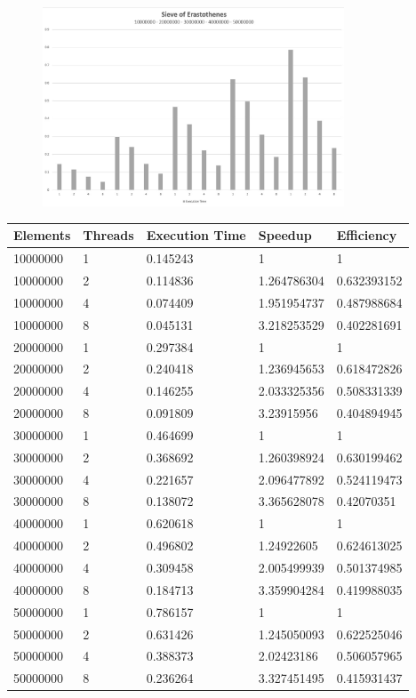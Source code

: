 \begin{figure}[H]
    \centering
    \includegraphics[width=0.8\textwidth]{graphics/Sieve.jpg}
    \label{fig:Sieve}
\end{figure}
\begin{table}[H]
    \centering
    \begin{tabular}{|l|l|l|l|l|}\hline
        Elements & Threads & Execution Time & Speedup & Efficiency \\\hline
        10000000 & 1 & 0.145243 & 1 & 1 \\
        10000000 & 2 & 0.114836 & 1.264786304 & 0.632393152\\
        10000000 & 4 & 0.074409 & 1.951954737 & 0.487988684\\
        10000000 & 8 & 0.045131 & 3.218253529 & 0.402281691\\\hline
        20000000 & 1 & 0.297384 & 1 & 1\\
        20000000 & 2 & 0.240418 & 1.236945653 & 0.618472826\\
        20000000 & 4 & 0.146255 & 2.033325356 & 0.508331339\\
        20000000 & 8 & 0.091809 & 3.23915956 & 0.404894945\\\hline
        30000000 & 1 & 0.464699 & 1 & 1\\
        30000000 & 2 & 0.368692 & 1.260398924 & 0.630199462\\
        30000000 & 4 & 0.221657 & 2.096477892 & 0.524119473\\
        30000000 & 8 & 0.138072 & 3.365628078 & 0.42070351\\\hline
        40000000 & 1 & 0.620618 & 1 & 1\\
        40000000 & 2 & 0.496802 & 1.24922605 & 0.624613025\\
        40000000 & 4 & 0.309458 & 2.005499939 & 0.501374985\\
        40000000 & 8 & 0.184713 & 3.359904284 & 0.419988035\\\hline
        50000000 & 1 & 0.786157 & 1 & 1\\
        50000000 & 2 & 0.631426 & 1.245050093 & 0.622525046\\
        50000000 & 4 & 0.388373 & 2.02423186 & 0.506057965\\
        50000000 & 8 & 0.236264 & 3.327451495 & 0.415931437\\\hline
    \end{tabular}
    \label{tab:Sieve_Table}
\end{table}




